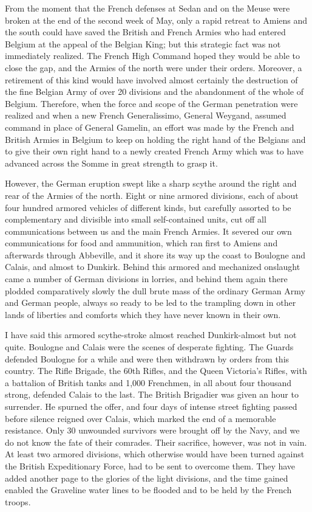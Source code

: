 \documentclass[a4paper]{amsbook}
\begin{document}
\vspace{10 mm}

From the moment that the French defenses at Sedan and on the Meuse were broken at the end of the second week of May, only a rapid retreat to Amiens and the south could have saved the British and French Armies who had entered Belgium at the appeal of the Belgian King; but this strategic fact was not immediately realized. The French High Command hoped they would be able to close the gap, and the Armies of the north were under their orders. Moreover, a retirement of this kind would have involved almost certainly the destruction of the fine Belgian Army of over 20 divisions and the abandonment of the whole of Belgium. Therefore, when the force and scope of the German penetration were realized and when a new French Generalissimo, General Weygand, assumed command in place of General Gamelin, an effort was made by the French and British Armies in Belgium to keep on holding the right hand of the Belgians and to give their own right hand to a newly created French Army which was to have advanced across the Somme in great strength to grasp it.

However, the German eruption swept like a sharp scythe around the right and rear of the Armies of the north. Eight or nine armored divisions, each of about four hundred armored vehicles of different kinds, but carefully assorted to be complementary and divisible into small self-contained units, cut off all communications between us and the main French Armies. It severed our own communications for food and ammunition, which ran first to Amiens and afterwards through Abbeville, and it shore its way up the coast to Boulogne and Calais, and almost to Dunkirk. Behind this armored and mechanized onslaught came a number of German divisions in lorries, and behind them again there plodded comparatively slowly the dull brute mass of the ordinary German Army and German people, always so ready to be led to the trampling down in other lands of liberties and comforts which they have never known in their own.

I have said this armored scythe-stroke almost reached Dunkirk-almost but not quite. Boulogne and Calais were the scenes of desperate fighting. The Guards defended Boulogne for a while and were then withdrawn by orders from this country. The Rifle Brigade, the 60th Rifles, and the Queen Victoria's Rifles, with a battalion of British tanks and 1,000 Frenchmen, in all about four thousand strong, defended Calais to the last. The British Brigadier was given an hour to surrender. He spurned the offer, and four days of intense street fighting passed before silence reigned over Calais, which marked the end of a memorable resistance. Only 30 unwounded survivors were brought off by the Navy, and we do not know the fate of their comrades. Their sacrifice, however, was not in vain. At least two armored divisions, which otherwise would have been turned against the British Expeditionary Force, had to be sent to overcome them. They have added another page to the glories of the light divisions, and the time gained enabled the Graveline water lines to be flooded and to be held by the French troops.
\end{document}
